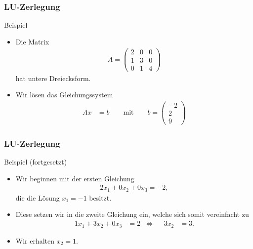 \documentclass{beamer}
\renewcommand{\oe}{\"o}
\newcommand{\mytitle}{LU-Zerlegung}
\begin{document}
\begin{frame}\frametitle{\mytitle}
	\begin{block}{Beispiel}
		\begin{itemize}
			\item Die Matrix
				\begin{align*}
				A=\begin{pmatrix}
					2&0&0\\
					1&3&0\\
					0&1&4
				\end{pmatrix}
				\end{align*}
				hat untere Dreiecksform.
			\item Wir l\oe sen das Gleichungssystem 
\begin{align*}
	Ax&=b\qquad\mbox{mit}\qquad b=\begin{pmatrix}-2\\2\\9\end{pmatrix}
\end{align*}
		\end{itemize}
	\end{block}
\end{frame}

\begin{frame}\frametitle{\mytitle}
	\begin{block}{Beispiel (fortgesetzt)}
		\begin{itemize}
			\item Wir beginnen mit der ersten Gleichung
				\begin{align*}
					2x_1+0x_2+0x_3=-2,
				\end{align*}
				die die L\oe sung $x_1=-1$ besitzt.
			\item Diese setzen wir in die zweite Gleichung ein, welche sich somit vereinfacht zu
				\begin{align*}
					1x_1+3x_2+0x_3&=2&
					\Leftrightarrow&&3x_2&=3.
				\end{align*}
			\item Wir erhalten $x_2=1$.
		\end{itemize}
	\end{block}
\end{frame}
\end{document}
